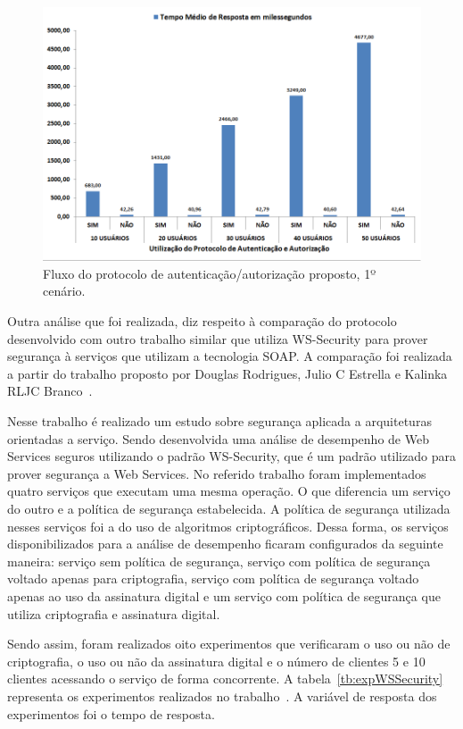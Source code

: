 \begin{figure}[!htb]
    \centering
    \includegraphics[width=1.0\textwidth]{grafico_teste_desempenho.png}
    \caption{Fluxo do protocolo de autenticação/autorização proposto, 1º cenário.}
    \label{fig:grafico_teste_desempenho}
\end{figure}

Outra análise que foi realizada, diz respeito à comparação do protocolo desenvolvido com outro trabalho similar que utiliza WS-Security para prover segurança à serviços que utilizam a tecnologia SOAP. A comparação foi realizada a partir do trabalho proposto por Douglas Rodrigues, Julio C Estrella e Kalinka RLJC Branco~\cite{rodrigues2011analysis}.

Nesse trabalho é realizado um estudo sobre segurança aplicada a arquiteturas orientadas a serviço. Sendo desenvolvida uma análise de desempenho de Web Services seguros utilizando o padrão WS-Security, que é um padrão utilizado para prover segurança a Web Services. No referido trabalho foram implementados quatro serviços que executam uma mesma operação. O que diferencia um serviço do outro e a política de segurança estabelecida. A política de segurança utilizada nesses serviços foi a do uso de algoritmos criptográficos. Dessa forma, os serviços disponibilizados para a análise de desempenho ficaram configurados da seguinte maneira: serviço sem política de segurança, serviço com política de segurança voltado apenas para criptografia, serviço com política de segurança  voltado apenas ao uso da assinatura digital e um serviço com política de segurança que utiliza criptografia e assinatura digital.

Sendo assim, foram realizados oito experimentos que verificaram o uso ou não de criptografia, o uso ou não da assinatura digital e o número de clientes  5 e 10 clientes acessando o serviço de forma concorrente. A tabela~\ref{tb:expWSSecurity} representa os experimentos realizados no trabalho~\cite{rodrigues2011analysis}. A variável de resposta dos experimentos foi o tempo de resposta.

